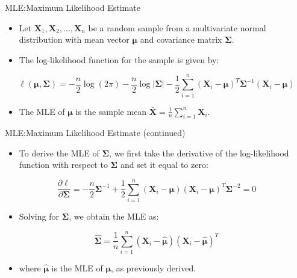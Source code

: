 \documentclass[
  ignorenonframetext,
]{beamer}
\providecommand{\tightlist}{%
  \setlength{\itemsep}{0pt}\setlength{\parskip}{0pt}}
\begin{document}
\begin{frame}{MLE:Maximum Likelihood Estimate}
\protect\hypertarget{mlemaximum-likelihood-estimate}{}
\begin{itemize}
\item
  Let \(\boldsymbol{X}_1, \boldsymbol{X}_2, ..., \boldsymbol{X}_n\) be a
  random sample from a multivariate normal distribution with mean vector
  \(\boldsymbol{\mu}\) and covariance matrix \(\boldsymbol{\Sigma}\).
\item
  The log-likelihood function for the sample is given by:
\end{itemize}

\[
\ell(\boldsymbol{\mu}, \boldsymbol{\Sigma}) = -\frac{n}{2} \log(2\pi) -\frac{n}{2} \log|\boldsymbol{\Sigma}| - \frac{1}{2} \sum_{i=1}^n (\boldsymbol{X}_i - \boldsymbol{\mu})^T \boldsymbol{\Sigma}^{-1} (\boldsymbol{X}_i - \boldsymbol{\mu})
\]

\begin{itemize}
\tightlist
\item
  The MLE of \(\boldsymbol{\mu}\) is the sample mean
  \(\bar{\boldsymbol{X}} = \frac{1}{n} \sum_{i=1}^n \boldsymbol{X}_i\).
\end{itemize}
\end{frame}

\begin{frame}{MLE:Maximum Likelihood Estimate (continued)}
\protect\hypertarget{mlemaximum-likelihood-estimate-continued}{}
\begin{itemize}
\tightlist
\item
  To derive the MLE of \(\boldsymbol{\Sigma}\), we first take the
  derivative of the log-likelihood function with respect to
  \(\boldsymbol{\Sigma}\) and set it equal to zero:
\end{itemize}

\[
\frac{\partial \ell}{\partial \boldsymbol{\Sigma}} = -\frac{n}{2} \boldsymbol{\Sigma}^{-1} + \frac{1}{2} \sum_{i=1}^n (\boldsymbol{X}_i - \boldsymbol{\mu})(\boldsymbol{X}_i - \boldsymbol{\mu})^T \boldsymbol{\Sigma}^{-2} = 0
\]

\begin{itemize}
\tightlist
\item
  Solving for \(\boldsymbol{\Sigma}\), we obtain the MLE as:
\end{itemize}

\[
\boldsymbol{\hat{\Sigma}} = \frac{1}{n} \sum_{i=1}^n (\boldsymbol{X}_i - \boldsymbol{\hat{\mu}})(\boldsymbol{X}_i - \boldsymbol{\hat{\mu}})^T
\]

\begin{itemize}
\tightlist
\item
  where \(\boldsymbol{\hat{\mu}}\) is the MLE of \(\boldsymbol{\mu}\),
  as previously derived.
\end{itemize}
\end{frame}
\end{document}
